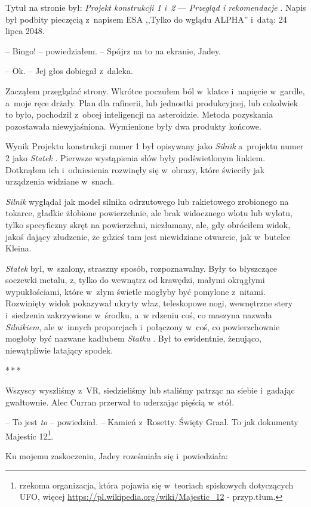 \documentclass[oneside,polish,12pt,sfheadings]{mwbk}
\newcommand{\threeast}{\bigskip\par\centerline{*\,*\,*}\medskip\par}%
\begin{document}
Tytuł na stronie był: \emph{Projekt konstrukcji 1 i~2} --- \emph{Przegląd
i rekomendacje }. Napis był podbity pieczęcią z~napisem ESA ,,Tylko do
wglądu ALPHA'' i~datą: 24 lipca 2048.

-- Bingo! -- powiedziałem. -- Spójrz na to na ekranie, Jadey.

-- Ok. -- Jej głos dobiegał z~daleka.

Zacząłem przeglądać strony. Wkrótce poczułem ból w~klatce i~napięcie w~gardle, a~moje ręce drżały. Plan dla rafinerii, lub jednostki
produkcyjnej, lub cokolwiek to było, pochodził z~obcej inteligencji na
asteroidzie. Metoda pozyskania pozostawała niewyjaśniona. Wymienione
były dwa produkty końcowe.

Wynik Projektu konstrukcji numer 1 był opisywany jako \emph{Silnik} a~projektu numer 2 jako \emph{Statek }. Pierwsze wystąpienia słów były
podświetlonym linkiem. Dotknąłem ich i~odniesienia rozwinęły się w~obrazy, które świeciły jak urządzenia widziane w~snach.

\emph{Silnik} wyglądał jak model silnika odrzutowego lub rakietowego
zrobionego na tokarce, gładkie żłobione powierzchnie, ale brak
widocznego wlotu lub wylotu, tylko specyficzny skręt na powierzchni,
niezłamany, ale, gdy obróciłem widok, jakoś dający złudzenie, że gdzieś
tam jest niewidziane otwarcie, jak w~butelce Kleina.

\emph{Statek} był, w~szalony, straszny sposób, rozpoznawalny. Były to
błyszczące soczewki metalu, z, tylko do wewnątrz od krawędzi, małymi
okrągłymi wypukłościami, które w~złym świetle mogłyby być pomylone z~nitami. Rozwinięty widok pokazywał ukryty właz, teleskopowe nogi,
wewnętrzne stery i~siedzenia zakrzywione w~środku, a~w rdzeniu coś, co
maszyna nazwała \emph{Silnikiem}, ale w~innych proporcjach i~połączony w~coś, co powierzchownie mogłoby być nazwane kadłubem \emph{Statku }. Był
to ewidentnie, żenująco, niewątpliwie latający spodek.

\threeast

Wszyscy wyszliśmy z~VR, siedzieliśmy lub staliśmy patrząc na siebie i~gadając gwałtownie. Alec Curran przerwał to uderzając pięścią w~stół.

-- To jest \emph{to} -- powiedział. -- Kamień z~Rosetty. Święty Graal. To
jak dokumenty Majestic 12\footnote{rzekoma organizacja,
która pojawia się w~teoriach spiskowych dotyczących UFO, więcej
\url{https://pl.wikipedia.org/wiki/Majestic\_12} - przyp.tłum.}.

Ku mojemu zaskoczeniu, Jadey roześmiała się i~powiedziała: 
\end{document}
